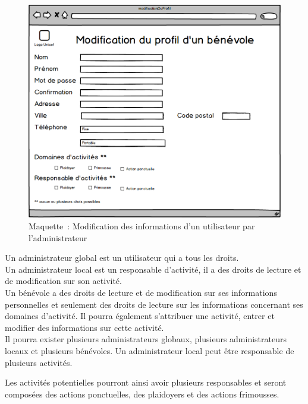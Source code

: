 \begin{figure}[H]
	\centering
	\includegraphics[scale=0.4]{images/maquettes/fonctionnalite1ModificationDUnProfilAdmin.png}
	 \caption{Maquette~: Modification des informations d'un utilisateur par l'administrateur}
	 \label{fonctionnalite1modificationDUnProfilAdmin}
\end{figure}

Un administrateur global est un utilisateur qui a tous les droits. \\ Un administrateur local est un responsable d'activité, il a des droits de lecture et de modification sur son activité. \\ Un bénévole a des droits de lecture et de modification sur ses informations personnelles et seulement des droits de lecture sur les informations concernant ses domaines d'activité. Il pourra également s'attribuer une activité, entrer et modifier des informations sur cette activité.\\
Il pourra exister plusieurs administrateurs globaux, plusieurs administrateurs locaux et plusieurs bénévoles. Un administrateur local peut être responsable de plusieurs activités.



Les activités potentielles pourront ainsi avoir plusieurs responsables et seront composées des actions ponctuelles, des plaidoyers et des actions frimousses. \\

